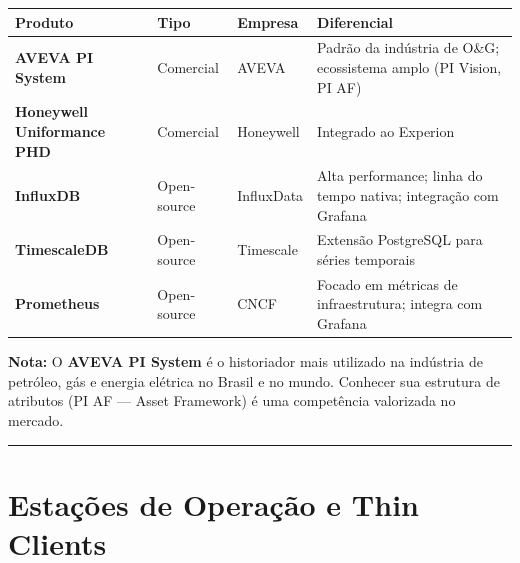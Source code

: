 \begin{longtable}[]{@{}
  >{\raggedright\arraybackslash}p{}
  >{\raggedright\arraybackslash}p{}
  >{\raggedright\arraybackslash}p{}
  >{\raggedright\arraybackslash}p{}@{}}
\toprule\noalign{}
\begin{minipage}[b]{\linewidth}\raggedright
Produto
\end{minipage} & \begin{minipage}[b]{\linewidth}\raggedright
Tipo
\end{minipage} & \begin{minipage}[b]{\linewidth}\raggedright
Empresa
\end{minipage} & \begin{minipage}[b]{\linewidth}\raggedright
Diferencial
\end{minipage} \\
\midrule\noalign{}
\endhead
\bottomrule\noalign{}
\endlastfoot
\textbf{AVEVA PI System} & Comercial & AVEVA & Padrão da indústria de O\&G; ecossistema amplo (PI Vision, PI AF) \\
\textbf{Honeywell Uniformance PHD} & Comercial & Honeywell & Integrado ao Experion \\
\textbf{InfluxDB} & Open-source & InfluxData & Alta performance; linha do tempo nativa; integração com Grafana \\
\textbf{TimescaleDB} & Open-source & Timescale & Extensão PostgreSQL para séries temporais \\
\textbf{Prometheus} & Open-source & CNCF & Focado em métricas de infraestrutura; integra com Grafana \\
\end{longtable}

\begin{caixanota}

\textbf{Nota:} O \textbf{AVEVA PI System} é o historiador mais utilizado na indústria de petróleo, gás e energia elétrica no Brasil e no mundo. Conhecer sua estrutura de atributos (PI AF --- Asset Framework) é uma competência valorizada no mercado.

\end{caixanota}

\begin{center}\rule{0.5\linewidth}{0.5pt}\end{center}

\section{Estações de Operação e Thin Clients}\label{estauxe7uxf5es-de-operauxe7uxe3o-e-thin-clients}

